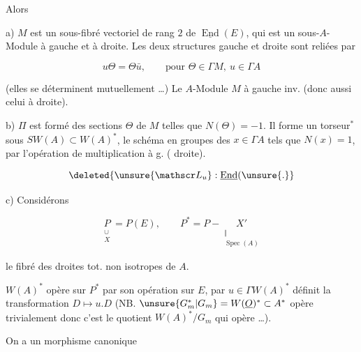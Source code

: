 
Alors

a) $M$ est un sous-fibré vectoriel de rang $2$ de $\underline{\operatorname{End}}(E)$, qui est un sous-$A$-Module à gauche et à droite. Les deux structures gauche et droite sont reliées par

\[
u\Theta=\Theta\bar u,\qquad\text{pour }\Theta\in\Gamma M,\ u\in\Gamma A
\]

(elles se déterminent  mutuellement \ldots) Le $A$-Module $M$ à gauche  inv. (donc aussi celui à droite).

b) $\Pi$ est formé des sections $\Theta$ de $M$ telles que $N(\Theta)=-1$. Il forme un torseur$^*$ sous $SW(A)\subset W(A)^*$, le  schéma en groupes des $x\in\Gamma A$ tels que $N(x)=1$, par l'opération de multiplication à g. (  droite).



\[
\deleted{\unsure{\mathscr L_u}:\underline{\operatorname{End}}(\unsure{.}}
\]

c) Considérons

\[
\underset{\substack{\cup\\X}}{P}=P(E),\qquad P^*=P-\underset{\substack{\Vert\\\operatorname{Spec}(A)}}{X'}
\]

le fibré des droites tot. non isotropes de $A$.

$W(A)^*$ opère sur $P^*$ par son opération sur $E$, par $u\in\Gamma W(A)^*$ définit la transformation $D\longmapsto u.D$ (NB. $\unsure{G_m^{*}|G_m}=W(\underline O)^*\subset A^*$ opère trivialement donc c'est le quotient $W(A)^*/G_m$ qui opère \ldots).

On a un  morphisme canonique


